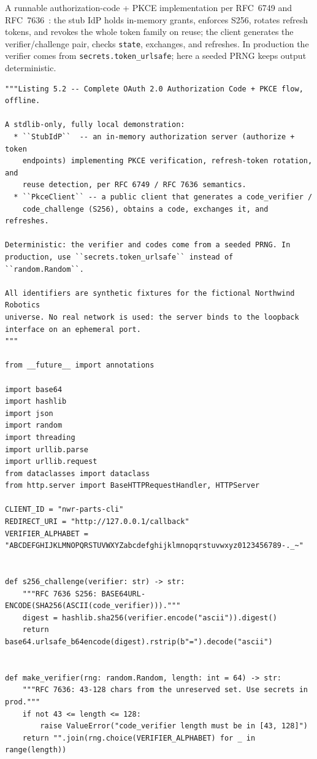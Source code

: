 A runnable authorization-code + PKCE implementation per RFC~6749 and
RFC~7636~\cite{rfc6749,rfc7636}: the stub IdP holds in-memory grants,
enforces S256, rotates refresh tokens, and revokes the whole token family on
reuse; the client generates the verifier/challenge pair, checks
\texttt{state}, exchanges, and refreshes. In production the verifier comes
from \texttt{secrets.token\_urlsafe}; here a seeded PRNG keeps output
deterministic.

\begin{verbatim}
"""Listing 5.2 -- Complete OAuth 2.0 Authorization Code + PKCE flow, offline.

A stdlib-only, fully local demonstration:
  * ``StubIdP``  -- an in-memory authorization server (authorize + token
    endpoints) implementing PKCE verification, refresh-token rotation, and
    reuse detection, per RFC 6749 / RFC 7636 semantics.
  * ``PkceClient`` -- a public client that generates a code_verifier /
    code_challenge (S256), obtains a code, exchanges it, and refreshes.

Deterministic: the verifier and codes come from a seeded PRNG. In
production, use ``secrets.token_urlsafe`` instead of ``random.Random``.

All identifiers are synthetic fixtures for the fictional Northwind Robotics
universe. No real network is used: the server binds to the loopback
interface on an ephemeral port.
"""

from __future__ import annotations

import base64
import hashlib
import json
import random
import threading
import urllib.parse
import urllib.request
from dataclasses import dataclass
from http.server import BaseHTTPRequestHandler, HTTPServer

CLIENT_ID = "nwr-parts-cli"
REDIRECT_URI = "http://127.0.0.1/callback"
VERIFIER_ALPHABET = "ABCDEFGHIJKLMNOPQRSTUVWXYZabcdefghijklmnopqrstuvwxyz0123456789-._~"


def s256_challenge(verifier: str) -> str:
    """RFC 7636 S256: BASE64URL-ENCODE(SHA256(ASCII(code_verifier)))."""
    digest = hashlib.sha256(verifier.encode("ascii")).digest()
    return base64.urlsafe_b64encode(digest).rstrip(b"=").decode("ascii")


def make_verifier(rng: random.Random, length: int = 64) -> str:
    """RFC 7636: 43-128 chars from the unreserved set. Use secrets in prod."""
    if not 43 <= length <= 128:
        raise ValueError("code_verifier length must be in [43, 128]")
    return "".join(rng.choice(VERIFIER_ALPHABET) for _ in range(length))



\end{verbatim}
